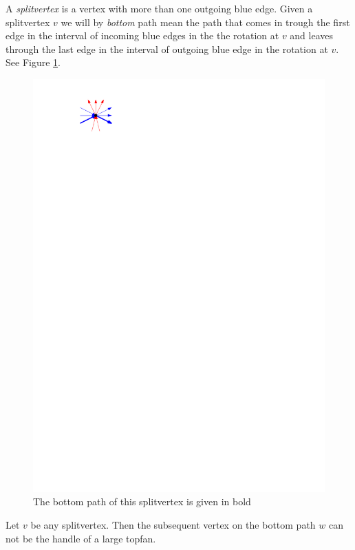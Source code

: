     A \emph{splitvertex} is a vertex with more than one outgoing blue edge.
    Given a splitvertex $v$ we will by \emph{bottom} path mean the path that comes in trough the first edge in the interval of incoming blue edges in the the rotation at $v$ and leaves through the last edge in the interval of outgoing blue edge in the rotation at $v$.
    See Figure \ref{fig:sweep:bottomPath}.

    \begin{figure}[h]
      \centering
      \includegraphics[scale=1]{unifiedAlgo/img/sweep/bottompath.pdf}
      \caption{The bottom path of this splitvertex is given in bold}
      \label{fig:sweep:bottomPath}
    \end{figure}

    \begin{lemma}
      \label{lm:sweep:NoTwoSplitsAboveEachOther}
      Let $v$ be any splitvertex. Then the subsequent vertex on the bottom path $w$ can not be the handle of a large topfan.
    \end{lemma}

